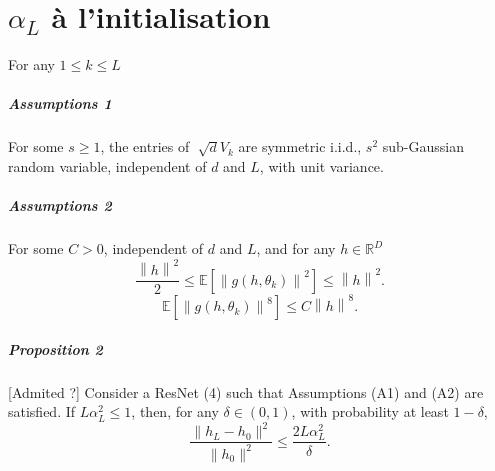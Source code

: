 \documentclass{report}
\theoremstyle{plain}%
\theoremstyle{definition}
\theoremstyle{remark}
\begin{document}
\chapter*{$ \alpha _L  $ à l'initialisation}
























For any $ 1 \leq  k \leq L  $ 

\paragraph*{Assumptions 1}
For some $ s \geq 1 $, the entries of $ \sqrt[]{d}V_k $ are symmetric i.i.d., $ s^2 $ sub-Gaussian random variable, independent of $ d $ and $ L $, with unit variance. 

\paragraph*{Assumptions 2}
For some $ C > 0 $, independent of $ d $ and $ L $, and for any $ h \in \mathbb{R}^D  $ 
\[
    \frac{\left\| h \right\| ^2}{2 } \leq  \mathbb{E }[ \left\|  g(h, \theta _ k ) \right\| ^2 ] \leq \left\| h \right\| ^2
.\]
\[
    \mathbb{E } [\left\| g(h, \theta _k)  \right\| ^8 ]\leq C \left\| h  \right\| ^8
.\]

\paragraph*{Proposition 2}[Admited ?]  Consider a ResNet (4) such that Assumptions (A1) and (A2) are satisfied.
If \( L\alpha_L^2 \leq 1 \), then, for any \( \delta \in (0, 1) \), with probability at least \( 1 - \delta \),
\[
\frac{\|h_L - h_0\|^2}{\|h_0\|^2} \leq \frac{2L\alpha_L^2}{\delta}.
\]
\end{document}
